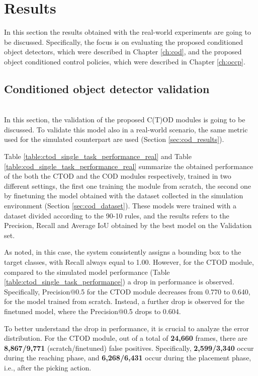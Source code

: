 \section{Results}
\label{sec:real_results}
In this section the results obtained with the real-world experiments are going to be discussed.
Specifically, the focus is on evaluating the proposed conditioned object detectors, which were described in Chapter \ref{ch:cod}, and the proposed object conditioned control policies, which were described in Chapter \ref{ch:occp}.

\subsection{Conditioned object detector validation}\mbox{}\\
In this section, the validation of the proposed C(T)OD modules is going to be discussed. To validate this model also in a real-world scenario, the same metric used for the simulated counterpart are used (Section \ref{sec:cod_results}). 

Table \ref{table:ctod_single_task_performance_real} and Table \ref{table:cod_single_task_performance_real} summarize the obtained performance of the both the CTOD and the COD modules respectively, trained in two different settings, the first one training the module from scratch, the second one by finetuning the model obtained with the dataset collected in the simulation environment (Section \ref{sec:cod_dataset}). These models were trained with a dataset divided according to the 90-10 rules, and the results refers to the Precision, Recall and Average IoU obtained by the best model on the Validation set.




As noted, in this case, the system consistently assigns a bounding box to the target classes, with Recall always equal to 1.00. However, for the CTOD module, compared to the simulated model performance (Table \ref{table:ctod_single_task_performance}) a drop in performance is observed. Specifically, Precision@0.5 for the CTOD module decreases from 0.770 to 0.640, for the model trained from scratch. Instead, a further drop is observed for the finetuned model, where the Precision@0.5 drops to 0.604.

To better understand the drop in performance, it is crucial to analyze the error distribution. For the CTOD module, out of a total of \textbf{24,660} frames, there are \textbf{8,867/9,771} (scratch/finetuned) false positives. Specifically, \textbf{2,599/3,340} occur during the reaching phase, and \textbf{6,268/6,431} occur during the placement phase, i.e., after the picking action. 

